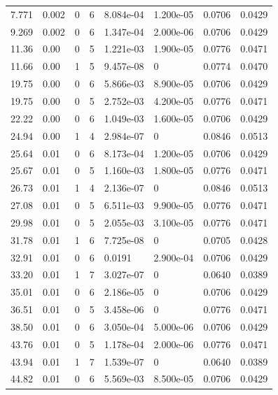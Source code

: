 \documentclass[preview]{standalone}
\begin{document}
{{\begin{tabular}{L{1.2cm}C{1.2cm} C{0.3cm}C{0.5cm} C{1.4cm}C{1.4cm} C{1.4cm}C{1.4cm}}
  7.771  &  0.002  & 0     &  6 &  8.084e-04  & 1.200e-05  & 0.0706 &  0.0429   \\ 
  9.269  &  0.002  & 0     &  6 &  1.347e-04  & 2.000e-06  & 0.0706 &  0.0429   \\ 
  11.36  &  0.00  & 0     &  5 &  1.221e-03  & 1.900e-05  & 0.0776 &  0.0471   \\ 
  11.66  &  0.00  & 1     &  5 &  9.457e-08  & 0  & 0.0774 &  0.0470   \\ 
  19.75  &  0.00  & 0     &  6 &  5.866e-03  & 8.900e-05  & 0.0706 &  0.0429   \\ 
  19.75  &  0.00  & 0     &  5 &  2.752e-03  & 4.200e-05  & 0.0776 &  0.0471   \\ 
  22.22  &  0.00  & 0     &  6 &  1.049e-03  & 1.600e-05  & 0.0706 &  0.0429   \\ 
  24.94  &  0.00  & 1     &  4 &  2.984e-07  & 0  & 0.0846 &  0.0513   \\ 
  25.64  &  0.01  & 0     &  6 &  8.173e-04  & 1.200e-05  & 0.0706 &  0.0429   \\ 
  25.67  &  0.01  & 0     &  5 &  1.160e-03  & 1.800e-05  & 0.0776 &  0.0471   \\ 
  26.73  &  0.01  & 1     &  4 &  2.136e-07  & 0  & 0.0846 &  0.0513   \\ 
  27.08  &  0.01  & 0     &  5 &  6.511e-03  & 9.900e-05  & 0.0776 &  0.0471   \\ 
  29.98  &  0.01  & 0     &  5 &  2.055e-03  & 3.100e-05  & 0.0776 &  0.0471   \\ 
  31.78  &  0.01  & 1     &  6 &  7.725e-08  & 0  & 0.0705 &  0.0428   \\ 
  32.91  &  0.01  & 0     &  6 &  0.0191  & 2.900e-04  & 0.0706 &  0.0429   \\ 
  33.20  &  0.01  & 1     &  7 &  3.027e-07  & 0  & 0.0640 &  0.0389   \\ 
  35.01  &  0.01  & 0     &  6 &  2.186e-05  & 0  & 0.0706 &  0.0429   \\ 
  36.51  &  0.01  & 0     &  5 &  3.458e-06  & 0  & 0.0776 &  0.0471   \\ 
  38.50  &  0.01  & 0     &  6 &  3.050e-04  & 5.000e-06  & 0.0706 &  0.0429   \\ 
  43.76  &  0.01  & 0     &  5 &  1.178e-04  & 2.000e-06  & 0.0776 &  0.0471   \\ 
  43.94  &  0.01  & 1     &  7 &  1.539e-07  & 0  & 0.0640 &  0.0389   \\ 
  44.82  &  0.01  & 0     &  6 &  5.569e-03  & 8.500e-05  & 0.0706 &  0.0429   \\ 

\end{tabular}}}
\end{document}
